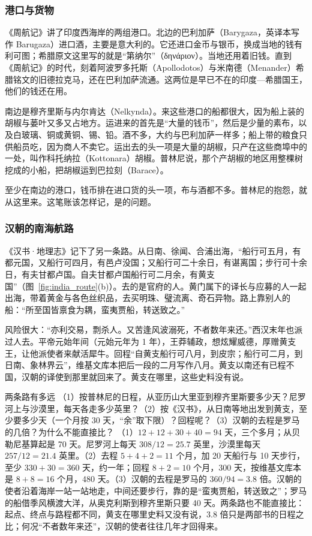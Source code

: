 \subsubsection{港口与货物}
《周航记》讲了印度西海岸的两组港口。北边的巴利加萨（Barygaza，英译本写作 Barugaza）进口酒，主要是意大利的。它还进口金币与银币，换成当地的钱有利可图；希腊原文这里写的就是“第纳尔”（δηνάριον）\cite{periplus}。当地还用着旧钱。直到《周航记》的时代，刻着阿波罗多托斯（Apollodotos）与米南德（Menander）希腊铭文的旧德拉克马，还在巴利加萨流通\cite{periplus}。这两位是早已不在的印度—希腊国王，他们的钱还在用。

南边是穆齐里斯与内尔肯达（Nelkynda）。来这些港口的船都很大，因为船上装的胡椒与蒌叶又多又占地方。运进来的首先是“大量的钱币”，然后是少量的素布，以及白玻璃、铜或黄铜、锡、铅。酒不多，大约与巴利加萨一样多；船上带的粮食只供船员吃，因为商人不卖它\cite{periplus}。运出去的头一项是大量的胡椒，只产在这些商埠中的一处，叫作科托纳拉（Kottonara）胡椒\cite{periplus}。普林尼说，那个产胡椒的地区用整棵树挖成的小船，把胡椒运到巴拉刻（Barace）\cite{pliny}。

至少在南边的港口，钱币排在进口货的头一项，布与酒都不多。普林尼的抱怨，就从这里来。这笔账该怎样记，是的问题。

\subsubsection{汉朝的南海航路}
《汉书·地理志》记下了另一条路。从日南、徐闻、合浦出海，“船行可五月，有都元国，又船行可四月，有邑卢没国；又船行可二十余日，有谌离国；步行可十余日，有夫甘都卢国。自夫甘都卢国船行可二月余，有黄支国”（图~\ref{fig:india_route}(b)）。去的是官府的人。黄门属下的译长与应募的人一起出海，带着黄金与各色丝织品，去买明珠、璧流离、奇石异物。路上靠别人的船：“所至国皆禀食为耦，蛮夷贾船，转送致之。”\cite{hanshu}

风险很大：“亦利交易，剽杀人。又苦逢风波溺死，不者数年来还。”西汉末年也派过人去。平帝元始年间（元始元年为 1 年），王莽辅政，想炫耀威德，厚赠黄支王，让他派使者来献活犀牛。回程“自黄支船行可八月，到皮宗；船行可二月，到日南、象林界云”，维基文库本把后一段的二月写作八月。黄支以南还有已程不国，汉朝的译使到那里就回来了\cite{hanshu}。黄支在哪里，这些史料没有说。

\begin{example}{两条路有多远}\label{ex:india-route}
（1）按普林尼的日程，从亚历山大里亚到穆齐里斯要多少天？尼罗河上与沙漠里，每天各走多少英里？（2）按《汉书》，从日南等地出发到黄支，至少要多少天（一个月按 30 天，“余”取下限）？回程呢？（3）汉朝的去程是罗马的几倍？为什么不能直接比？
\solution （1）$12+12+30+40=94$ 天，三个多月；从贝勒尼基算起是 70 天。尼罗河上每天 $308/12=25.7$ 英里，沙漠里每天 $257/12=21.4$ 英里。（2）去程 $5+4+2=11$ 个月，加 20 天船行与 10 天步行，至少 $330+30=360$ 天，约一年；回程 $8+2=10$ 个月，300 天，按维基文库本是 $8+8=16$ 个月，480 天。（3）汉朝的去程是罗马的 $360/94=3.8$ 倍。汉朝的使者沿着海岸一站一站地走，中间还要步行，靠的是“蛮夷贾船，转送致之”；罗马的船借季风横渡大洋，从奥克利斯到穆齐里斯只要 40 天。两条路也不能直接比：起点、终点与路程都不同，黄支在哪里史料又没有说，3.8 倍只是两部书的日程之比；何况“不者数年来还”，汉朝的使者往往几年才回得来。
\end{example}

